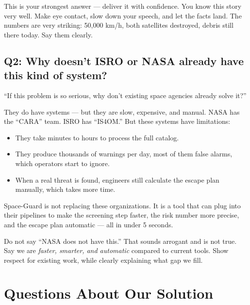 \documentclass[11pt,a4paper]{article}
\begin{document}
\begin{tipbox}
This is your strongest answer --- deliver it with confidence. You know this story very well. Make eye contact, slow down your speech, and let the facts land. The numbers are very striking: 50,000 km/h, both satellites destroyed, debris still there today. Say them clearly.
\end{tipbox}

\newpage
\subsection*{Q2: Why doesn't ISRO or NASA already have this kind of system?}

\begin{questionbox}
``If this problem is so serious, why don't existing space agencies already solve it?''
\end{questionbox}

\begin{answerbox}
They do have systems --- but they are slow, expensive, and manual. NASA has the ``CARA'' team. ISRO has ``IS4OM.'' But these systems have limitations:
\begin{itemize}
    \item They take minutes to hours to process the full catalog.
    \item They produce thousands of warnings per day, most of them false alarms, which operators start to ignore.
    \item When a real threat is found, engineers still calculate the escape plan manually, which takes more time.
\end{itemize}
Space-Guard is not replacing these organizations. It is a tool that can plug into their pipelines to make the screening step faster, the risk number more precise, and the escape plan automatic --- all in under 5 seconds.
\end{answerbox}

\begin{tipbox}
Do not say ``NASA does not have this.'' That sounds arrogant and is not true. Say we are \textit{faster, smarter, and automatic} compared to current tools. Show respect for existing work, while clearly explaining what gap we fill.
\end{tipbox}

\newpage
\section{Questions About Our Solution}
\end{document}
